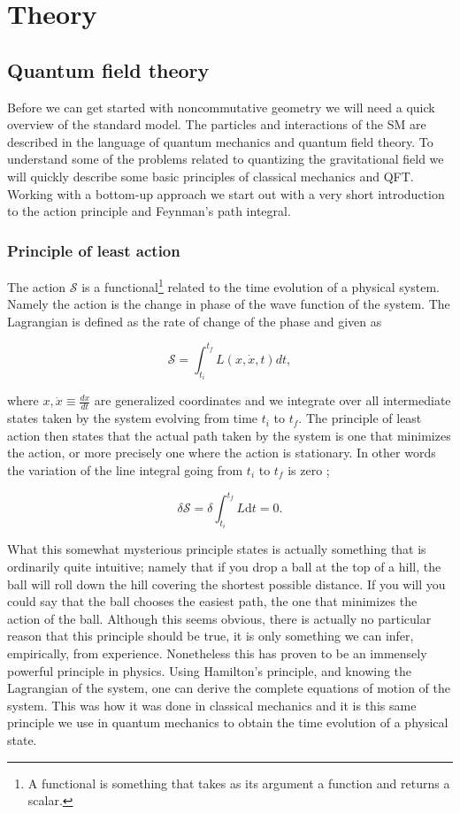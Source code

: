 \section{Theory}
\subsection{Quantum field theory}
Before we can get started with noncommutative geometry we will need a quick overview of the standard model. The particles and interactions of the SM are described in the language of quantum mechanics and quantum field theory. To understand some of the problems related to quantizing the gravitational field we will quickly describe some basic principles of classical mechanics and QFT. Working with a bottom-up approach we start out with a very short introduction to the action principle and Feynman's path integral.

\subsubsection{Principle of least action}
The action $\mathcal{S}$ is a functional\footnote{A functional is something that takes as its argument a function and returns a scalar.} related to the time evolution of a physical system. Namely the action is the change in phase of the wave function of the system. The Lagrangian is defined as the rate of change of the phase and given as

\begin{equation}\label{eq:S}
	\mathcal{S} = \int_{t_i}^{t_f} L(x,\dot{x},t)dt,
\end{equation}

where $x, \dot{x} \equiv \frac{dx}{dt}$ are generalized coordinates and we integrate over all intermediate states taken by the system evolving from time $t_i$ to $t_f$. The principle of least action then states that the actual path taken by the system is one that minimizes the action, or more precisely one where the action is stationary. In other words the variation of the line integral going from $t_i$ to $t_f$ is zero \cite{goldstein1959};

\begin{equation}
	\delta \mathcal{S} = \delta \int_{t_i}^{t_f} L \textrm{d}t = 0.
\end{equation}

What this somewhat mysterious principle states is actually something that is ordinarily quite intuitive; namely that if you drop a ball at the top of a hill, the ball will roll down the hill covering the shortest possible distance. If you will you could say that the ball chooses the easiest path, the one that minimizes the action of the ball. Although this seems obvious, there is actually no particular reason that this principle should be true, it is only something we can infer, empirically, from experience. Nonetheless this has proven to be an immensely powerful principle in physics. Using Hamilton's principle, and knowing the Lagrangian of the system, one can derive the complete equations of motion of the system. This was how it was done in classical mechanics and it is this same principle we use in quantum mechanics to obtain the time evolution of a physical state.

